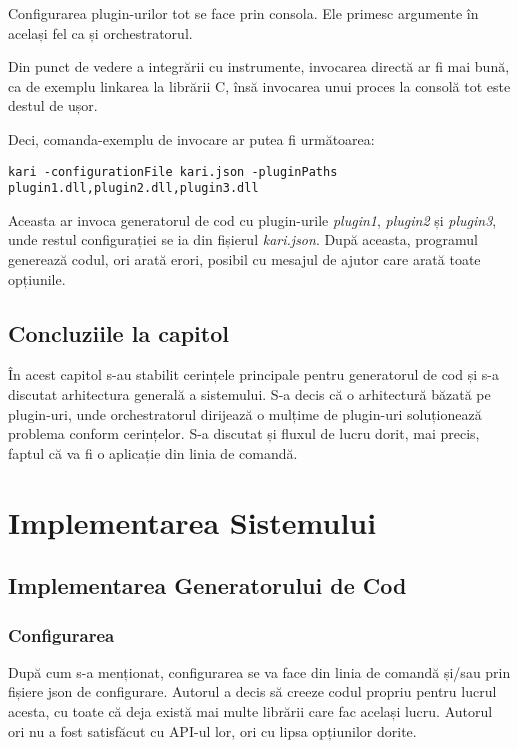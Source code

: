 \documentclass[a4paper,12pt]{report}
\def\oldchapter{} \let\oldchapter=\chapter{}
\def\chapter{\stepcounter{num_chapters}\oldchapter}
\newcommand\chapterConclusionSection[1]{\section{Concluziile la capitol \arabic{chapter}}}
\begin{document}
Configurarea plugin-urilor tot se face prin consola.
Ele primesc argumente în același fel ca și orchestratorul.

Din punct de vedere a integrării cu instrumente, invocarea directă ar fi mai bună, ca de exemplu linkarea la librării C, însă invocarea unui proces la consolă tot este destul de ușor.

Deci, comanda-exemplu de invocare ar putea fi următoarea:

\begin{verbatim}
kari -configurationFile kari.json -pluginPaths plugin1.dll,plugin2.dll,plugin3.dll
\end{verbatim}

Aceasta ar invoca generatorul de cod cu plugin-urile \textit{plugin1}, \textit{plugin2} și \textit{plugin3}, unde restul configurației se ia din fișierul \textit{kari{.}json}.
După aceasta, programul generează codul, ori arată erori, posibil cu mesajul de ajutor care arată toate opțiunile.


\chapterConclusionSection{architecture_chapter_title}

În acest capitol s-au stabilit cerințele principale pentru generatorul de cod și s-a discutat arhitectura generală a sistemului.
S-a decis că o arhitectură băzată pe plugin-uri, unde orchestratorul dirijează o mulțime de plugin-uri soluționează problema conform cerințelor.
S-a discutat și fluxul de lucru dorit, mai precis, faptul că va fi o aplicație din linia de comandă.

\chapter{Implementarea Sistemului}\label{implementation_chapter_title}

\section{Implementarea Generatorului de Cod}

\subsection{Configurarea}

După cum s-a menționat, configurarea se va face din linia de comandă și/sau prin fișiere json de configurare.
Autorul a decis să creeze codul propriu pentru lucrul acesta, cu toate că deja există mai multe librării care fac același lucru.
Autorul ori nu a fost satisfăcut cu \ac{API}-ul lor, ori cu lipsa opțiunilor dorite.
\end{document}
